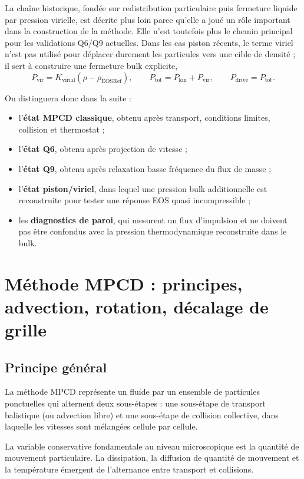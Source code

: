 \documentclass[11pt,a4paper]{article}
\begin{document}
La chaîne historique, fondée sur redistribution particulaire puis fermeture liquide par pression virielle, est décrite plus loin parce qu'elle a joué un rôle important dans la construction de la méthode. Elle n'est toutefois plus le chemin principal pour les validations Q6/Q9 actuelles. Dans les cas piston récents, le terme viriel n'est pas utilisé pour déplacer durement les particules vers une cible de densité ; il sert à construire une fermeture bulk explicite,
\begin{equation}
  P_{\mathrm{vir}} = K_{\mathrm{virial}}(\rho-\rho_{\mathrm{EOSRef}}),
  \qquad
  P_{\mathrm{tot}}=P_{\mathrm{kin}}+P_{\mathrm{vir}},
  \qquad
  P_{\mathrm{drive}}=P_{\mathrm{tot}}.
\end{equation}

On distinguera donc dans la suite :
\begin{itemize}
  \item l'\textbf{état MPCD classique}, obtenu après transport, conditions limites, collision et thermostat ;
  \item l'\textbf{état Q6}, obtenu après projection de vitesse ;
  \item l'\textbf{état Q9}, obtenu après relaxation basse fréquence du flux de masse ;
  \item l'\textbf{état piston/viriel}, dans lequel une pression bulk additionnelle est reconstruite pour tester une réponse EOS quasi incompressible ;
  \item les \textbf{diagnostics de paroi}, qui mesurent un flux d'impulsion et ne doivent pas être confondus avec la pression thermodynamique reconstruite dans le bulk.
\end{itemize}

\section{Méthode MPCD : principes, advection, rotation, décalage de grille}

\subsection{Principe général}

La méthode MPCD représente un fluide par un ensemble de particules ponctuelles qui alternent deux sous-étapes : une sous-étape de transport balistique (ou advection libre) et une sous-étape de collision collective, dans laquelle les vitesses sont mélangées cellule par cellule.

La variable conservative fondamentale au niveau microscopique est la quantité de mouvement particulaire. La dissipation, la diffusion de quantité de mouvement et la température émergent de l'alternance entre transport et collisions.
\end{document}

